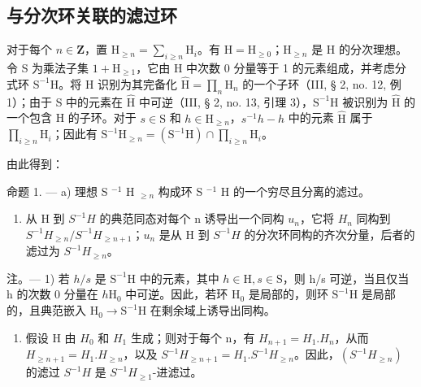 \subsection{与分次环关联的滤过环}

对于每个 \(n \in \mathbf{Z}\)，置 \(\mathrm{H}_{\geqslant n} = \sum_{i \geqslant n} \mathrm{H}_i\)。有 \(\mathrm{H} = \mathrm{H}_{\geqslant 0}\)；\(\mathrm{H}_{\geqslant n}\) 是 \(\mathrm{H}\) 的分次理想。令 S 为乘法子集 \(1 + \mathrm{H}_{\geqslant 1}\)，它由 H 中次数 0 分量等于 1 的元素组成，并考虑分式环 \(\mathrm{S}^{-1}\mathrm{H}\)。将 H 识别为其完备化 \(\hat{\mathrm{H}} = \prod_{n} \mathrm{H}_{n}\) 的一个子环（III, § 2, no. 12, 例 1）；由于 S 中的元素在 \(\hat{\mathrm{H}}\) 中可逆（III, § 2, no. 13, 引理 3），\(\mathrm{S}^{-1}\mathrm{H}\) 被识别为 \(\hat{\mathrm{H}}\) 的一个包含 H 的子环。对于 \(s \in \mathrm{S}\) 和 \(h \in \mathrm{H}_{\geqslant n}\)，\(s^{-1}h - h\) 中的元素 \(\hat{\mathrm{H}}\) 属于 \(\prod_{i \geqslant n} \mathrm{H}_i\)；因此有 \(\mathrm{S}^{-1}\mathrm{H}_{\geqslant n} = (\mathrm{S}^{-1}\mathrm{H}) \cap \prod_{i \geqslant n} \mathrm{H}_i\)。

由此得到：

命题 1. --- a) 理想 S \(^{-1}\) H \(_{≥n}\) 构成环 S \(^{-1}\) H 的一个穷尽且分离的滤过。

\begin{enumerate}
\def\labelenumi{\alph{enumi})}
\setcounter{enumi}{1}
\tightlist
\item
  从 H 到 \(S^{-1}H\) 的典范同态对每个 n 诱导出一个同构 \(u_{n}\)，它将 \(H_{n}\) 同构到 \(S^{-1}H_{\geqslant n}/S^{-1}H_{\geqslant n+1}\)；\(u_{n}\) 是从 H 到 \(S^{-1}H\) 的分次环同构的齐次分量，后者的滤过为 \(S^{-1}H_{\geqslant n}\)。
\end{enumerate}

注。--- 1) 若 \(h/s\) 是 \(\mathrm{S}^{-1}\mathrm{H}\) 中的元素，其中 \(h\in\mathrm{H}, s\in\mathrm{S}\)，则 h/s 可逆，当且仅当 h 的次数 0 分量在 \(h\)\(\mathrm{H}_{0}\) 中可逆。因此，若环 \(\mathrm{H}_{0}\) 是局部的，则环 \(\mathrm{S}^{-1}\mathrm{H}\) 是局部的，且典范嵌入 \(\mathrm{H}_{0}\to\mathrm{S}^{-1}\mathrm{H}\) 在剩余域上诱导出同构。

\begin{enumerate}
\def\labelenumi{\arabic{enumi})}
\setcounter{enumi}{1}
\tightlist
\item
  假设 H 由 \(H_{0}\) 和 \(H_{1}\) 生成；则对于每个 n，有 \(H_{n+1} = H_{1}.H_{n}\)，从而 \(H_{\geqslant n+1} = H_{1}.H_{\geqslant n}\)，以及 \(S^{-1}H_{\geqslant n+1} = H_{1}.S^{-1}H_{\geqslant n}\)。因此，\((S^{-1}H_{\geqslant n})\) 的滤过 \(S^{-1}H\) 是 \(S^{-1}H_{\geqslant 1}\)-进滤过。
\end{enumerate}

